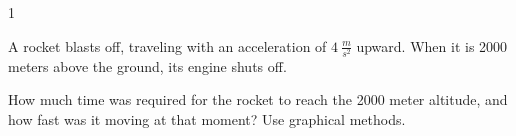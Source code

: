 
\AddToShipoutPicture*{\BackgroundPic}

\addtocounter {ProbNum} {1}

 
{\bf \Large{}} A rocket blasts off, traveling with an acceleration of ${4~\tfrac{m}{s^2}}$ upward.  When it is 2000 meters above the ground, its engine shuts off. \bigskip

How much time was required for the rocket to reach the 2000 meter altitude, and how fast was it moving at that moment? Use graphical methods.\paragraph{}
\noindent


\vfill
\newpage
